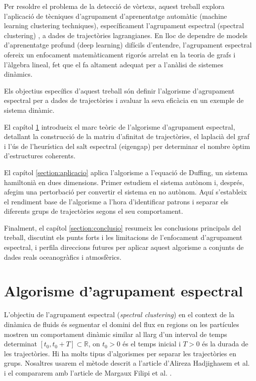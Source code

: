 \documentclass[12,twoside]{TFG-GM}
\theoremstyle{definition}
\theoremstyle{remark}
\newcommand{\R}{\mathbb{R}}
\begin{document}
Per resoldre el problema de la detecció de vòrtexs, aquest treball explora l'aplicació de tècniques d'agrupament d'aprenentatge automàtic (machine learning clustering techniques), específicament l'agrupament espectral (spectral clustering) \cite{vonLuxburg2007}, a dades de trajectòries lagrangianes. En lloc de dependre de models d'aprenentatge profund (deep learning) difícils d'entendre, l'agrupament espectral ofereix un enfocament matemàticament rigorós arrelat en la teoria de grafs i l'àlgebra lineal, fet que el fa altament adequat per a l'anàlisi de sistemes dinàmics.

Els objectius específics d'aquest treball són definir l'algorisme d'agrupament espectral per a dades de trajectòries i avaluar la seva eficàcia en un exemple de sistema dinàmic.

El capítol \ref{section:teoria} introdueix el marc teòric de l'algorisme d'agrupament espectral, detallant la construcció de la matriu d'afinitat de trajectòries, el laplacià del graf i l'ús de l'heurística del salt espectral (eigengap) per determinar el nombre òptim d'estructures coherents.

El capítol \ref{section:aplicacio} aplica l'algorisme a l'equació de Duffing, un sistema hamiltonià en dues dimensions. Primer estudiem el sistema autònom i, després, afegim una pertorbació per convertir el sistema en no autònom. Aquí s'estableix el rendiment base de l'algorisme a l'hora d'identificar patrons i separar els diferents grups de trajectòries segons el seu comportament. 

Finalment, el capítol \ref{section:conclusio} resumeix les conclusions principals del treball, discutint els punts forts i les limitacions de l'enfocament d'agrupament espectral, i perfila direccions futures per aplicar aquest algorisme a conjunts de dades reals oceanogràfics i atmosfèrics.


\section{Algorisme d'agrupament espectral}\label{section:teoria}

L'objectiu de l'agrupament espectral (\textit{spectral clustering}) en el context de la dinàmica de fluids és segmentar el domini del flux en regions on les partícules mostren un comportament dinàmic similar al llarg d'un interval de temps determinat $[t_0, t_0 + T]\subset\R$, on $t_0>0$ és el temps inicial i $T>0$ és la durada de les trajectòries. Hi ha molts tipus d'algorismes per separar les trajectòries en grups. Nosaltres usarem el mètode descrit a l'article d'Alireza Hadjighasem et al. \cite{Hadjighasem2016} i el compararem amb l'article de Margaux Filipi et al. \cite{Filippi2021}.
\end{document}
